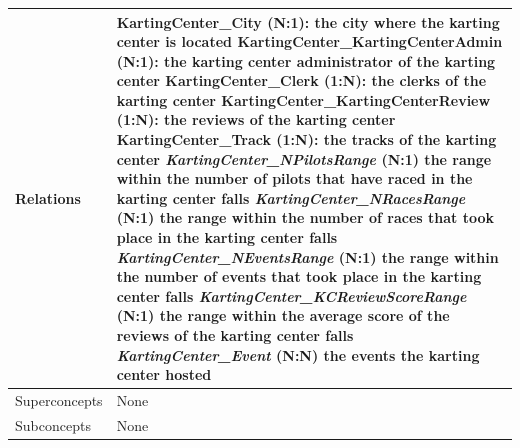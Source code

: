 \documentclass{beamer}
\begin{document}
\begin{frame}
\begin{table}
\tiny
\begin{tabular}{|p{2cm}|p{6cm}|}
\hline
Relations &
KartingCenter\_City (N:1): the city where the karting center is located \newline
KartingCenter\_KartingCenterAdmin (N:1): the karting center administrator of the karting center \newline
KartingCenter\_Clerk (1:N): the clerks of the karting center \newline
KartingCenter\_KartingCenterReview (1:N): the reviews of the karting center \newline
KartingCenter\_Track (1:N): the tracks of the karting center \newline
\textit{KartingCenter\_NPilotsRange} (N:1) the range within the number of pilots that have raced in the karting center falls \newline
\textit{KartingCenter\_NRacesRange} (N:1) the range within the number of races that took place in the karting center falls \newline
\textit{KartingCenter\_NEventsRange} (N:1) the range within the number of events that took place in the karting center falls \newline
\textit{KartingCenter\_KCReviewScoreRange} (N:1) the range within the average score of the reviews of the karting center falls \newline
\textit{KartingCenter\_Event} (N:N) the events the karting center hosted \\
\hline
Superconcepts & None \\
\hline
Subconcepts & None \\
\hline
\end{tabular}
\end{table}
\end{frame}
\end{document}
